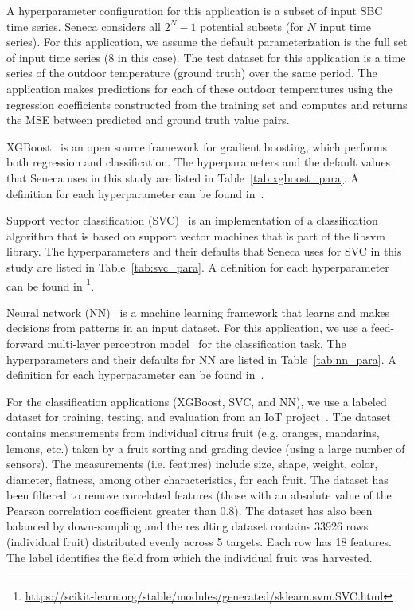 A hyperparameter configuration for this application is 
a subset of input SBC time series.
Seneca considers all \texttt{$2^N - 1$} potential subsets (for $N$ input time series).
For this application,
we assume the default parameterization is the 
full set of input time series (8 in this case).
The test dataset for this application is a time 
series of the outdoor temperature (ground truth) 
over the same period.  The application makes 
predictions for each of these outdoor temperatures
using the regression coefficients constructed from the training set
and computes and returns the MSE between predicted 
and ground truth value pairs.


XGBoost~\cite{ref:xgboost-web} is an open source 
framework for gradient boosting, which 
performs both regression and classification. 
The hyperparameters and the default values that Seneca uses 
in this study are listed in Table~\ref{tab:xgboost_para}. 
A definition for each hyperparameter can be found in~\cite{ref:xgboostparams}.

Support vector classification (SVC)~\cite{ref:svc} 
is an implementation of a classification algorithm 
that is based on support vector machines that is part of the
libsvm~\cite{ref:libsvm} library.
The hyperparameters and their defaults that Seneca uses for SVC in this study are listed in Table~\ref{tab:svc_para}. A definition for each hyperparameter can be found in
\footnote{\url{https://scikit-learn.org/stable/modules/generated/sklearn.svm.SVC.html}}.

Neural network (NN)~\cite{ref:neural_network} is a machine 
learning framework that learns 
and makes decisions from patterns in an input dataset. For this application, 
we use a feed-forward multi-layer perceptron model~\cite{ref:feedforward_nn} 
for the classification task.
The hyperparameters and their defaults for NN 
are listed in Table~\ref{tab:nn_para}. 
A definition for each hyperparameter can be found in~\cite{ref:nnparams}.

For the classification applications (XGBoost, SVC, and NN), we use a labeled
dataset for training, testing, and evaluation from an IoT 
project~\cite{blind}. The dataset contains measurements from individual
citrus fruit (e.g. oranges, mandarins, lemons, etc.) taken by a fruit sorting
and grading device (using a large number of sensors).  The measurements (i.e.
features) include size, shape, weight, color, diameter, flatness, among other
characteristics, for each fruit.  
The dataset has been filtered to remove correlated
features (those with an absolute value of the Pearson correlation coefficient
greater than 0.8). The dataset has also been balanced by 
down-sampling and the resulting 
dataset contains 33926 rows (individual fruit) 
distributed evenly across 5 targets. Each row has
18 features.  The label identifies the field from which the 
individual fruit was harvested.

